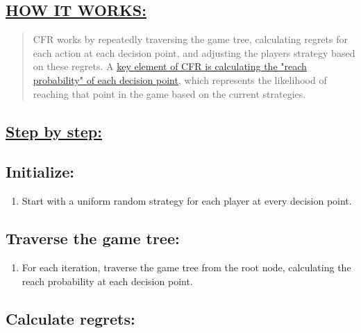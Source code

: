 \documentclass[
]{article}
\begin{document}
\subsection*{\texorpdfstring{\textbf{\ul{HOW IT
WORKS:}}}{HOW IT WORKS:}}\label{how-it-works}

\begin{quote}
CFR works by repeatedly traversing the game tree, calculating regrets
for each action at each decision point, and adjusting the
player\textquotesingle s strategy based on these regrets. A
\href{http://modelai.gettysburg.edu/2013/cfr/cfr.pdf}{\ul{key element of
CFR is calculating the "reach probability" of each decision point}},
which represents the likelihood of reaching that point in the game based
on the current strategies.
\end{quote}

\subsection*{\texorpdfstring{\textbf{\ul{Step by
step:}}}{Step by step:}}\label{step-by-step}

\subsection{Initialize:}\label{initialize}

\begin{enumerate}
\def\labelenumi{\alph{enumi}.}
\item
  Start with a uniform random strategy for each player at every decision
  point.
\end{enumerate}

\subsection{Traverse the game tree:}\label{traverse-the-game-tree}

\begin{enumerate}
\def\labelenumi{\alph{enumi}.}
\setcounter{enumi}{1}
\item
  For each iteration, traverse the game tree from the root node,
  calculating the reach probability at each decision point.
\end{enumerate}

\subsection{Calculate regrets:}\label{calculate-regrets}
\end{document}
